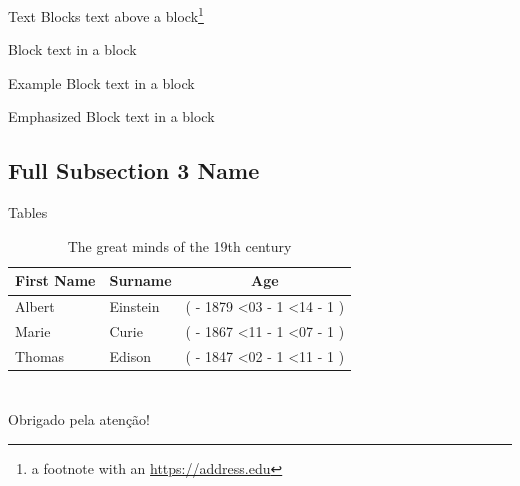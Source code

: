 \documentclass[
  aspectratio=169,
]{beamer}
\begin{document}
\begin{frame}{Text Blocks}
text above a block\footnote{a footnote with an \url{https://address.edu}}
\begin{block}{Block}
  text in a block
\end{block}
\begin{exampleblock}{Example Block}
  text in a block
\end{exampleblock}
\begin{alertblock}{Emphasized Block}
  text in a block
\end{alertblock}
\end{frame}


\subsection[Short Subsection 3 Name]{Full Subsection 3 Name}

\def\age(#1-#2-#3){%
  \the\numexpr(
    \year - #1
    \ifnum\month<#2
      - 1
    \else
      \ifnum\month=#2
        \ifnum\day<#3
          - 1
        \fi
      \fi
    \fi
  )%
}

\begin{frame}{Tables}
\begin{table}
  \begin{tabular}{llc}
    First Name & Surname & Age \\ \midrule
    Albert & Einstein & \age(1879-03-14) \\
    Marie & Curie & \age(1867-11-07) \\
    Thomas & Edison & \age(1847-02-11) \\
  \end{tabular}
  \caption{The great minds of the 19th century}
\end{table}
\end{frame}

\section{\bibname}
\begin{frame}[t, allowframebreaks]{\bibname}
\printbibliography[heading=none]
\end{frame}

\begin{frame}[plain]
\vfill
\centerline{Obrigado pela atenção!}
\vfill\vfill
\end{frame}

\end{document}
